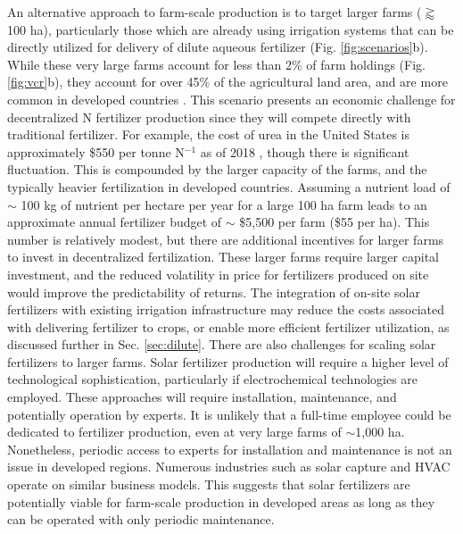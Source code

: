 An alternative approach to farm-scale production is to target larger farms ($\gtrapprox$ 100 ha), particularly those which are already using irrigation systems that can be directly utilized for delivery of dilute aqueous fertilizer (Fig. \ref{fig:scenarios}b). While these very large farms account for less than 2\% of farm holdings (Fig. \ref{fig:vcr}b), they account for over 45\% of the agricultural land area, and are more common in developed countries \cite{Lowder_2016}. This scenario presents an economic challenge for decentralized N fertilizer production since they will compete directly with traditional fertilizer. For example, the cost of urea in the United States is approximately \$550 per tonne N$^{-1}$ as of 2018 \cite{Argus_Feb}, though there is significant fluctuation. This is compounded by the larger capacity of the farms, and the typically heavier fertilization in developed countries. Assuming a nutrient load of $\sim$ 100 kg of nutrient per hectare per year for a large 100 ha farm leads to an approximate annual fertilizer budget of $\sim$ \$5,500 per farm (\$55 per ha). This number is relatively modest, but there are additional incentives for larger farms to invest in decentralized fertilization. These larger farms require larger capital investment, and the reduced volatility in price for fertilizers produced on site would improve the predictability of returns. The integration of on-site solar fertilizers with existing irrigation infrastructure may reduce the costs associated with delivering fertilizer to crops, or enable more efficient fertilizer utilization, as discussed further in Sec. \ref{sec:dilute}. There are also challenges for scaling solar fertilizers to larger farms. Solar fertilizer production will require a higher level of technological sophistication, particularly if electrochemical technologies are employed. These approaches will require installation, maintenance, and potentially operation by experts. It is unlikely that a full-time employee could be dedicated to fertilizer production, even at very large farms of $\sim$1,000 ha. Nonetheless, periodic access to experts for installation and maintenance is not an issue in developed regions. Numerous industries such as solar capture and HVAC operate on similar business models. This suggests that solar fertilizers are potentially viable for farm-scale production in developed areas as long as they can be operated with only periodic maintenance.

